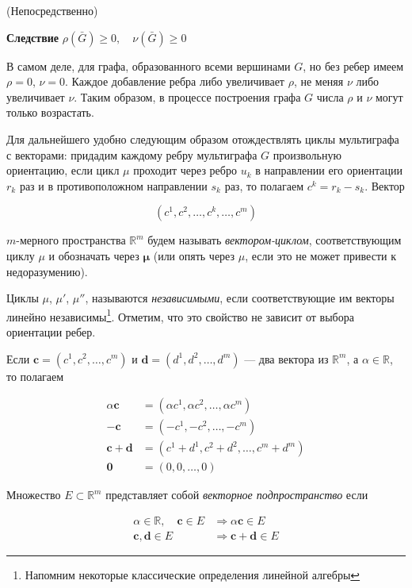 (Непосредственно)

\textbf{Следствие} \quad $\rho(\bar{G}) \geq 0, \quad \nu(\bar{G}) \geq 0$

В самом деле, для графа, образованного всеми вершинами $G$, но без ребер имеем $\rho = 0$, $\nu = 0$. Каждое добавление ребра либо увеличивает $\rho$, не меняя $\nu$ либо увеличивает $\nu$. Таким образом, в процессе построения графа $G$ числа $\rho$ и $\nu$ могут только возрастать.

Для дальнейшего удобно следующим образом отождествлять циклы мультиграфа с векторами: придадим каждому ребру мультиграфа $G$ произвольную ориентацию, если цикл $\mu$ проходит через ребро $u_k$ в направлении его ориентации $r_k$ раз и в противоположном направлении $s_k$ раз, то полагаем $c^k = r_k - s_k$. Вектор

\[(c^1, c^2, \ldots, c^k, \ldots, c^m)\]

$m$-мерного пространства $\mathbb{R}^m$ будем называть \textit{вектором-циклом}, соответствующим циклу $\mu$ и обозначать через $\boldsymbol{\mu}$ (или опять через $\mu$, если это не может привести к недоразумению).

Циклы $\mu$, $\mu'$, $\mu''$, называются \textit{независимыми}, если соответствующие им векторы линейно независимы\footnote{Напомним некоторые классические определения линейной алгебры}. Отметим, что это свойство не зависит от выбора ориентации ребер.

Если $\mathbf{c} = (c^1, c^2, \ldots, c^m)$ и $\mathbf{d} = (d^1, d^2, \ldots, d^m)$ --- два вектора из $\mathbb{R}^m$, а $\alpha \in \mathbb{R}$, то полагаем

\[\begin{aligned}
\alpha\mathbf{c} &= (\alpha c^1, \alpha c^2, \ldots, \alpha c^m) \\
-\mathbf{c} &= (-c^1, -c^2, \ldots, -c^m) \\
\mathbf{c} + \mathbf{d} &= (c^1 + d^1, c^2 + d^2, \ldots, c^m + d^m) \\
\mathbf{0} &= (0, 0, \ldots, 0)
\end{aligned}\]

Множество $E \subset \mathbb{R}^m$ представляет собой \textit{векторное подпространство} если

\[\begin{aligned}
\alpha \in \mathbb{R}, \quad \mathbf{c} \in E &\Rightarrow \alpha\mathbf{c} \in E \\
\mathbf{c}, \mathbf{d} \in E &\Rightarrow \mathbf{c} + \mathbf{d} \in E
\end{aligned}\]

